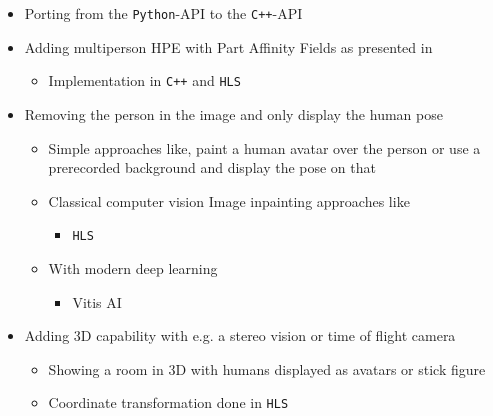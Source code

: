 \documentclass[a4paper,12pt]{book}
\begin{document}
  \begin{itemize}
    \item Porting from the \texttt{Python}-API to the \texttt{C++}-API
      \item Adding multiperson HPE with Part Affinity Fields as presented in \cite{cao_simon_wei_sheikh_2017}
      \begin{itemize}
          \item  Implementation in \texttt{C++} and \texttt{HLS}
      \end{itemize}
      \item Removing the person in the image and only display the human pose
      \begin{itemize}
        \item Simple approaches like, paint a human avatar over the person or use a prerecorded background and display the pose on that
          \item Classical computer vision Image inpainting approaches like \cite{criminisi_perez_toyama_2004}
          \begin{itemize}
              \item \texttt{HLS}
          \end{itemize}
          \item With modern deep learning \cite{nazeri_ng_joseph_qureshi_ebrahimi_2019}
          \begin{itemize}
              \item Vitis AI
          \end{itemize}
      \end{itemize}
      \item Adding 3D capability with e.g. a stereo vision or time of flight camera
      \begin{itemize}
        \item Showing a room in 3D with humans displayed as avatars or stick figure
        \item Coordinate transformation done in \texttt{HLS} 
      \end{itemize} 
  \end{itemize}

  
  {}
  
\end{document}
